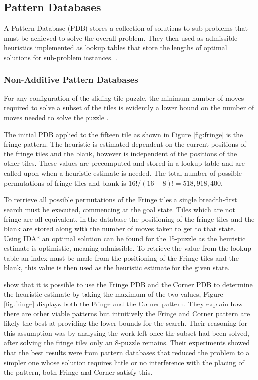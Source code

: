 \documentclass[final]{cmpreport}
\begin{document}
\subsection{Pattern Databases}
A Pattern Database (PDB) stores a collection of solutions to sub-problems that must be achieved to solve the overall problem. They then used as admissible heuristics implemented as lookup tables that store the lengths of optimal solutions for sub-problem instances. \citep{DBLP:journals/jair/FelnerKMH07}.

\subsubsection{Non-Additive Pattern Databases}\label{Section:nonadditive}
For any configuration of the sliding tile puzzle, the minimum number of moves required to solve a subset of the tiles is evidently a lower bound on the number of moves needed to solve the puzzle \cite{felner2004additive}.





The initial PDB applied to the fifteen tile as shown in Figure \ref{fig:fringe} is the fringe pattern. The heuristic is estimated dependent on the current positions of the fringe tiles and the blank, however is independent of the positions of the other tiles. These values are precomputed and stored in a lookup table and are called upon when a heuristic estimate is needed. The total number of possible permutations of fringe tiles and blank is $16!/(16-8)!=518,918,400$. 

To retrieve all possible permutations of the Fringe tiles a single breadth-first search must be executed, commencing at the goal state. Tiles which are not fringe are all equivalent, in the database the positioning of the fringe tiles and the blank are stored along with the number of moves taken to get to that state. Using IDA* an optimal solution can be found for the 15-puzzle as the heuristic estimate is optimistic, meaning admissible. To retrieve the value from the lookup table an index must be made from the positioning of the Fringe tiles and the blank, this value is then used as the heuristic estimate for the given state.

\cite{culberson1998pattern} show that it is possible to use the Fringe PDB and the Corner PDB to determine the heuristic estimate by taking the maximum of the two values, Figure \ref{fig:fringe} displays both the Fringe and the Corner pattern. They explain how there are other viable patterns but intuitively the Fringe and Corner pattern are likely the best at providing the lower bounds for the search. Their reasoning for this assumption was by analysing the work left once the subset had been solved, after solving the fringe tiles only an 8-puzzle remains. Their experiments showed that the best results were from pattern databases that reduced the problem to a simpler one whose solution requires little or no interference with the placing of the pattern, both Fringe and Corner satisfy this.
\end{document}
